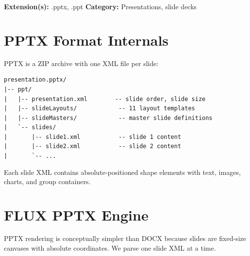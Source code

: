 \documentclass[11pt, a4paper, openright]{report}
\newcommand{\filesection}[3]{%
  \begin{insightbox}[title={File Type Overview: #1}]
  \textbf{Extension(s):} #2 \quad \textbf{Category:} #3
  \end{insightbox}
}
\begin{document}
\filesection{PPTX / PPT}{.pptx, .ppt}{Presentations, slide decks}

\section{PPTX Format Internals}

PPTX is a ZIP archive with one XML file per slide:

\begin{lstlisting}[caption=PPTX Internal Structure]
presentation.pptx/
|-- ppt/
|   |-- presentation.xml        -- slide order, slide size
|   |-- slideLayouts/            -- 11 layout templates
|   |-- slideMasters/            -- master slide definitions
|   `-- slides/
|       |-- slide1.xml           -- slide 1 content
|       |-- slide2.xml           -- slide 2 content
|       `-- ...
\end{lstlisting}

Each slide XML contains absolute-positioned shape elements with text, images, charts, and group containers.

\section{FLUX PPTX Engine}

PPTX rendering is conceptually simpler than DOCX because slides are fixed-size canvases with absolute coordinates. We parse one slide XML at a time.
\end{document}
